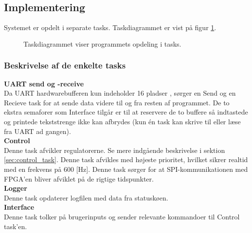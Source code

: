 
%
\subsection{Implementering}
% 
% 
Systemet er opdelt i separate tasks.
Taskdiagrammet er vist på figur \ref{fig:task_diagram}. 

\begin{figure}[!h]
\centering
\begin{tikzpicture}[node distance = 3.2cm]
	
\end{tikzpicture}
\caption[Taskdiagram]{Taskdiagrammet viser programmets opdeling i tasks.}
\label{fig:task_diagram}
\end{figure}

\subsubsection{Beskrivelse af de enkelte tasks}
	\textbf{UART send og -receive}\\ 
	Da UART hardwarebufferen kun indeholder 16 pladser \citep[Side. 430]{lm3s6965},
	sørger en Send og en Recieve task for at sende data videre til og fra resten af programmet.
	De to ekstra semaforer som Interface tilgår er til at reservere de to buffere så indtastede og
	printede tekststrenge ikke kan afbrydes (kun én task kan skrive til eller læse fra UART ad gangen).\\
	\textbf{Control}\\ 
	Denne task afvikler regulatorerne. Se mere indgående beskrivelse i sektion \ref{sec:control_task}.
	Denne task afvikles med højeste prioritet, hvilket sikrer realtid med en frekvens på 600 [Hz]. 
	Denne task sørger for at SPI-kommunikationen med FPGA'en bliver afviklet på de rigtige tidspunkter.\\
	\textbf{Logger}\\ 
	Denne task opdaterer logfilen med data fra statuskøen.\\
	\textbf{Interface}\\ 
	Denne task tolker på brugerinputs og sender relevante kommandoer til Control task'en.

